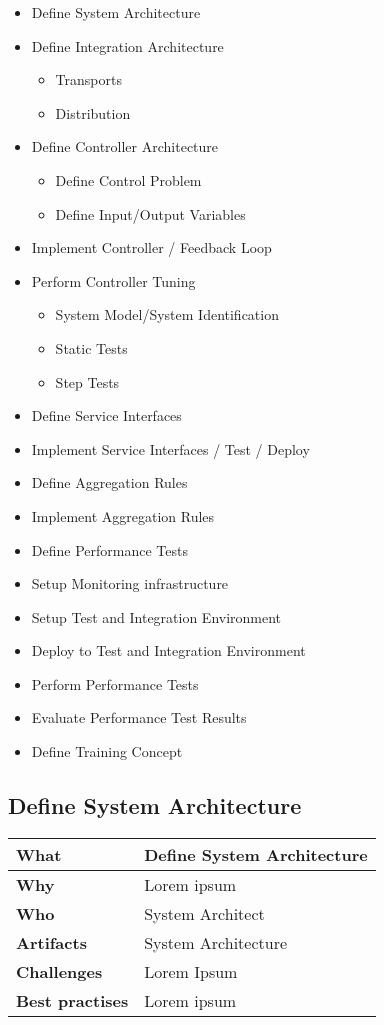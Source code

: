 \begin{itemize}
	\item Define System Architecture 
	\item Define Integration Architecture
	\begin{itemize}
		\item Transports
		\item Distribution
	\end{itemize}
	\item Define Controller Architecture 
	\begin{itemize}
		\item Define Control Problem 
		\item Define Input/Output Variables 
	\end{itemize}
	\item Implement Controller / Feedback Loop
	\item Perform Controller Tuning 
	\begin{itemize}
		\item System Model/System Identification 
		\item Static Tests
		\item Step Tests
	\end{itemize}
	\item Define Service Interfaces
	\item Implement Service Interfaces / Test / Deploy
	\item Define Aggregation Rules
	\item Implement Aggregation Rules 
	\item Define Performance Tests 
	\item Setup Monitoring infrastructure
	\item Setup Test and Integration Environment
	\item Deploy to Test and Integration Environment
	\item Perform Performance Tests
	\item Evaluate Performance Test Results
	\item Define Training Concept
\end{itemize}

\subsection{Define System Architecture }
 \label{table:ch6_Task_Define_System_Architecture}
\begin{tabular}
	{|m{3cm}|m{10cm}|} \hline \bfseries What & Define System Architecture\\
	\hline \bfseries Why & Lorem ipsum\\
	\hline \bfseries Who & System Architect\\
	\hline \bfseries Artifacts & System Architecture\\
	\hline \bfseries Challenges & Lorem Ipsum\\
	\hline \bfseries Best practises & Lorem ipsum\\
	\hline 
\end{tabular}

